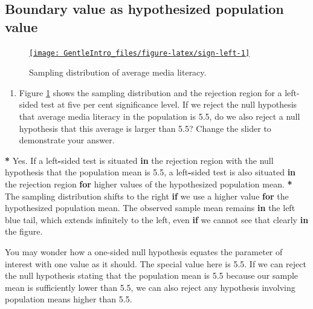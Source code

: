 \documentclass[a4paper]{book}
\newenvironment{Shaded}{\begin{snugshade}}{\end{snugshade}}
\newcommand{\FloatTok}[1]{\textcolor[rgb]{0.00,0.00,0.00}{#1}}
\newcommand{\StringTok}[1]{\textcolor[rgb]{0.00,0.00,0.00}{#1}}
\newcommand{\ControlFlowTok}[1]{\textcolor[rgb]{0.00,0.00,0.00}{\textbf{#1}}}
\newcommand{\OperatorTok}[1]{\textcolor[rgb]{0.00,0.00,0.00}{\textbf{#1}}}
\newcommand{\NormalTok}[1]{#1}
\providecommand{\tightlist}{%
  \setlength{\itemsep}{0pt}\setlength{\parskip}{0pt}}
\theoremstyle{definition}
\theoremstyle{definition}
\theoremstyle{definition}
\theoremstyle{remark}
\begin{document}
\subsection{Boundary value as hypothesized population
value}\label{boundary-value-as-hypothesized-population-value}

\begin{figure}[H]
\href{http://82.196.4.233:3838/apps/sign-left/}{\texttt{[image: GentleIntro\_files/figure-latex/sign-left-1]} }\caption{Sampling distribution of average media literacy.}\label{fig:sign-left}
\end{figure}

\begin{enumerate}
\def\labelenumi{\arabic{enumi}.}
\tightlist
\item
  Figure \ref{fig:sign-left} shows the sampling distribution and the
  rejection region for a left-sided test at five per cent significance
  level. If we reject the null hypothesis that average media literacy in
  the population is 5.5, do we also reject a null hypothesis that this
  average is larger than 5.5? Change the slider to demonstrate your
  answer.
\end{enumerate}

\begin{Shaded}
\begin{Highlighting}[]
\OperatorTok{*}\StringTok{ }\NormalTok{Yes. If a left}\OperatorTok{-}\NormalTok{sided test is situated }\ControlFlowTok{in}\NormalTok{ the rejection region with the null}
\NormalTok{hypothesis that the population mean is }\FloatTok{5.5}\NormalTok{, a left}\OperatorTok{-}\NormalTok{sided test is also situated}
\ControlFlowTok{in}\NormalTok{ the rejection region }\ControlFlowTok{for}\NormalTok{ higher values of the hypothesized population mean.}
\OperatorTok{*}\StringTok{ }\NormalTok{The sampling distribution shifts to the right }\ControlFlowTok{if}\NormalTok{ we use a higher value }\ControlFlowTok{for}
\NormalTok{the hypothesized population mean. The observed sample mean remains }\ControlFlowTok{in}\NormalTok{ the left}
\NormalTok{blue tail, which extends infinitely to the left, even }\ControlFlowTok{if}\NormalTok{ we cannot see that}
\NormalTok{clearly }\ControlFlowTok{in}\NormalTok{ the figure.}
\end{Highlighting}
\end{Shaded}

You may wonder how a one-sided null hypothesis equates the parameter of
interest with one value as it should. The special value here is 5.5. If
we can reject the null hypothesis stating that the population mean is
5.5 because our sample mean is sufficiently lower than 5.5, we can also
reject any hypothesis involving population means higher than 5.5.
\end{document}
